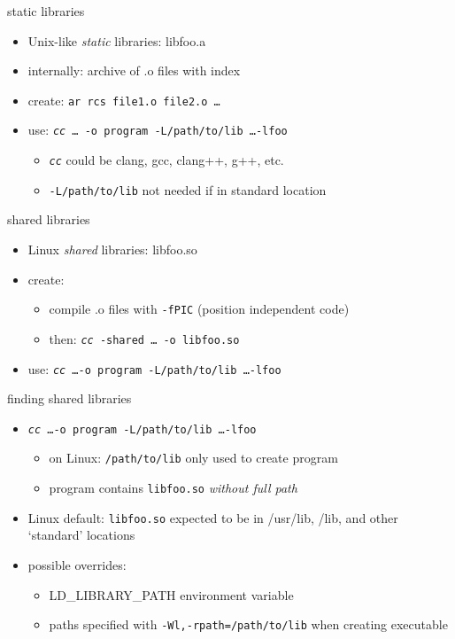 \begin{frame}{static libraries}
    \begin{itemize}
    \item Unix-like \textit{static} libraries: libfoo.a
    \item internally: archive of .o files with index
    \item create: \texttt{ar rcs file1.o file2.o \ldots}
    \item use: \texttt{\textit{cc} \ldots~-o program -L/path/to/lib \ldots -lfoo}
        \begin{itemize}
        \item \texttt{\textit{cc}} could be clang, gcc, clang++, g++, etc.
        \item \texttt{-L/path/to/lib} not needed if in standard location
        \end{itemize}
    \end{itemize}
\end{frame}

\begin{frame}{shared libraries}
    \begin{itemize}
    \item Linux \textit{shared} libraries: libfoo.so
    \item create:
        \begin{itemize}
        \item compile .o files with \texttt{-fPIC} (position independent code)
        \item then: \texttt{\textit{cc} -shared \ldots~-o libfoo.so}
        \end{itemize}
    \item use: \texttt{\textit{cc} \ldots -o program -L/path/to/lib \ldots -lfoo}
    \end{itemize}
\end{frame}

\begin{frame}{finding shared libraries}
    \begin{itemize}
    \item \texttt{\textit{cc} \ldots -o program -L/path/to/lib \ldots -lfoo}
        \begin{itemize}
        \item on Linux: \texttt{/path/to/lib} only used to create program
        \item program contains \texttt{libfoo.so} \textit{without full path}
        \end{itemize}
    \item Linux default: \texttt{libfoo.so} expected to be in /usr/lib, /lib, and other `standard' locations
    \item possible overrides:
        \begin{itemize}
        \item LD\_LIBRARY\_PATH environment variable
        \item paths specified with \texttt{-Wl,-rpath=/path/to/lib} when creating executable
        \end{itemize}
    \end{itemize}
\end{frame}
